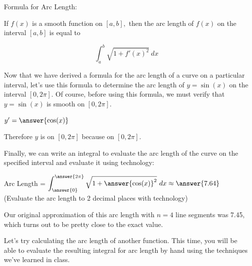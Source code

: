 \documentclass[handout,nooutcomes]{ximera}
\begin{document}
Formula for Arc Length: 

If $f(x)$ is a smooth function on $[a,b],$ then the arc length of $f(x)$ on the interval $[a,b]$ is equal to 

$$\displaystyle\int_{a}^{b} \sqrt{1+{f'(x)}^2} \ dx$$



Now that we have derived a formula for the arc length of a curve on a particular interval, let's use this formula to determine the arc length of $y=\sin(x)$ on the interval $[0,2\pi]$.  Of course, before using this formula, we must verify that $y=\sin(x)$ is smooth on $[0,2\pi]$.

\begin{problem}

$y' = \answer{\cos(x)}$

\begin{problem}

Therefore $y$ is  on $[0,2\pi]$ because  on $[0,2\pi]$.  

\begin{problem}

Finally, we can write an integral to evaluate the arc length of the curve on the specified interval and evaluate it using technology: 

Arc Length = $\displaystyle\int_{\answer{0}}^{\answer{2\pi}} \sqrt{1+{\answer{\cos(x)}^2}} \ dx \approx \answer{7.64}$ (Evaluate the arc length to 2 decimal places with technology)

\begin{feedback}[correct]
Our original approximation of this arc length with $n=4$ line segments was 7.45, which turns out to be pretty close to the exact value. 
\end{feedback}


\end{problem}
\end{problem}
\end{problem}

Let's try calculating the arc length of another function.  This time, you will be able to evaluate the resulting integral for arc length by hand using the techniques we've learned in class.

\end{document}
